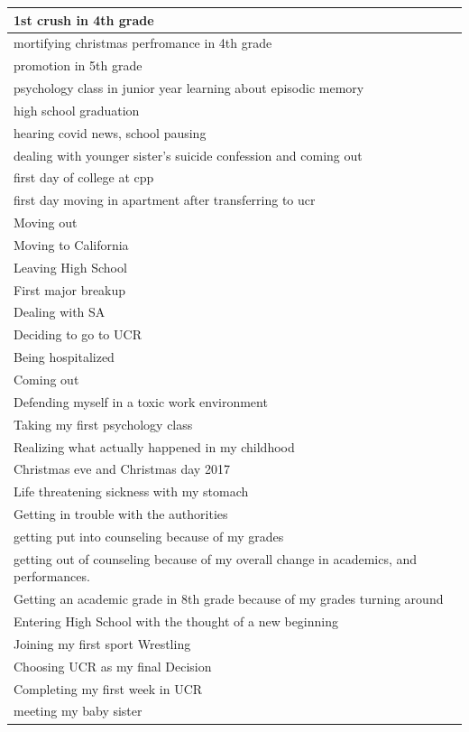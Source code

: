 \documentclass[
  .7em,
  letterpaper,
  DIV=11,
  numbers=noendperiod]{scrartcl}
\begin{document}
\begin{table}
\begin{tabular}{l}
\hline
1st crush in 4th grade\\
\hline
mortifying christmas perfromance in 4th grade\\
\hline
promotion in 5th grade\\
\hline
psychology class in junior year learning about episodic memory\\
\hline
high school graduation\\
\hline
hearing covid news, school pausing\\
\hline
dealing with younger sister's suicide confession and coming out\\
\hline
first day of college at cpp\\
\hline
first day moving in apartment after transferring to ucr\\
\hline
Moving out\\
\hline
Moving to California\\
\hline
Leaving High School\\
\hline
First major breakup\\
\hline
Dealing with SA\\
\hline
Deciding to go to UCR\\
\hline
Being hospitalized\\
\hline
Coming out\\
\hline
Defending myself in a toxic work environment\\
\hline
Taking my first psychology class\\
\hline
Realizing what actually happened in my childhood\\
\hline
Christmas eve and Christmas day 2017\\
\hline
Life threatening sickness with my stomach\\
\hline
Getting in trouble with the authorities\\
\hline
getting put into counseling because of my grades\\
\hline
getting out of counseling because of my overall change in academics, and performances.\\
\hline
Getting an academic grade in 8th grade because of my grades turning around\\
\hline
Entering High School with the thought of a new beginning\\
\hline
Joining  my first sport Wrestling\\
\hline
Choosing UCR as my final Decision\\
\hline
Completing my first week in UCR\\
\hline
meeting my baby sister\\

\end{tabular}
\end{table}
\end{document}
